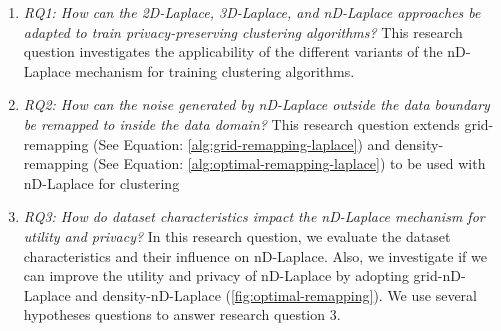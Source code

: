 \begin{enumerate}
    \item \textit{RQ1: How can the 2D-Laplace, 3D-Laplace, and nD-Laplace approaches be adapted to train privacy-preserving clustering algorithms?} \newline
          This research question investigates the applicability of the different variants of the nD-Laplace mechanism for training clustering algorithms.
    \item \textit{RQ2: How can the noise generated by nD-Laplace outside the data boundary be remapped to inside the data domain?} \newline
          This research question extends grid-remapping (See Equation: \ref{alg:grid-remapping-laplace}) and density-remapping (See Equation: \ref{alg:optimal-remapping-laplace}) to be used with nD-Laplace for clustering
    \item \textit{RQ3: How do dataset characteristics impact the nD-Laplace mechanism for utility and privacy?} \newline
          In this research question, we evaluate the dataset characteristics and their influence on nD-Laplace.
          Also, we investigate if we can improve the utility and privacy of nD-Laplace by adopting grid-nD-Laplace and density-nD-Laplace (\ref{fig:optimal-remapping}).
          We use several hypotheses questions to answer research question 3.


\end{enumerate}
